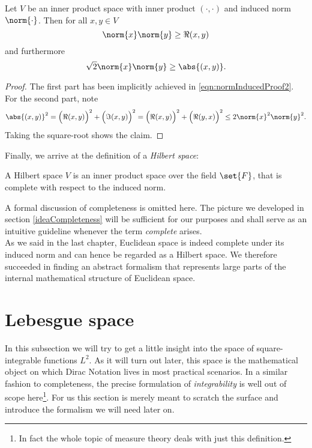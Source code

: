 \begin{cor}
	\label{eqn:CS}
	Let $V$ be an inner product space with inner product $(\cdot,\cdot)$ and induced norm $\norm{\cdot}$. Then for all $x,y \in V$
	\[ \norm{x} \norm{y} \ge \Re (x,y) \]
	and furthermore
	\[ \sqrt{2} \norm{x} \norm{y} \ge \abs{(x,y)}. \]
\end{cor}
\begin{proof}
	The first part has been implicitly achieved in \eqref{eqn:normInducedProof2}. For the second part, note
	\[ \abs{(x,y)}^2 = \Big( \Re (x,y) \Big)^2 + \Big( \Im (x,y) \Big)^2  = \Big( \Re (x,y) \Big)^2 + \Big( \Re (y,x) \Big)^2 \le 2 \norm{x}^2 \norm{y}^2.\]
	Taking the square-root shows the claim.
\end{proof}

\noindent
Finally, we arrive at the definition of a \emph{Hilbert space}:
\begin{defn}
	A Hilbert space $V$ is an inner product space over the field $\set{F}$, that is complete with respect to the induced norm.
\end{defn}

\begin{nte}
	A formal discussion of completeness is omitted here.
	The picture we developed in section \vref{ideaCompleteness} will be sufficient for our purposes and shall serve as an intuitive guideline whenever the term \emph{complete} arises. \\

	As we said in the last chapter, Euclidean space is indeed complete under its induced norm and can hence be regarded as a Hilbert space.
	We therefore succeeded in finding an abstract formalism that represents large parts of the internal mathematical structure of Euclidean space.
\end{nte}

\section{Lebesgue space}
In this subsection we will try to get a little insight into the space of square-integrable functions $L^2$.
As it will turn out later, this space is the mathematical object on which Dirac Notation lives in most practical scenarios.
In a similar fashion to completeness, the precise formulation of \emph{integrability} is well out of scope here\footnote{In fact the whole topic of measure theory deals with just this definition.}. 
For us this section is merely meant to scratch the surface and introduce the formalism we will need later on. \\

